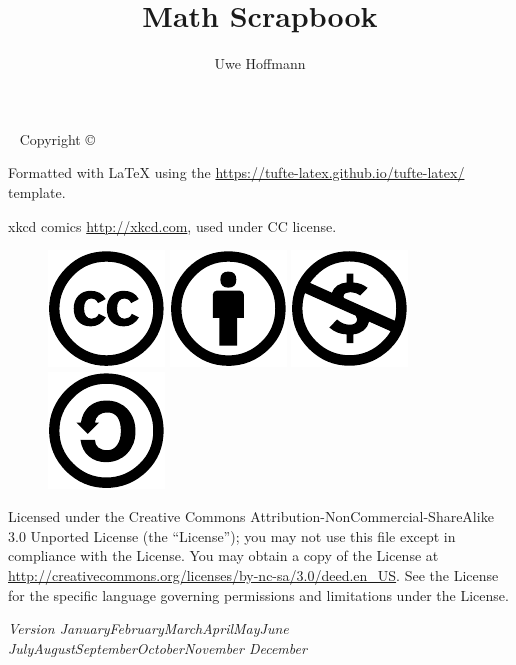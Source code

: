 \documentclass[justified, openany]{tufte-book}
\title{Math Scrapbook}
\author{Uwe Hoffmann}
\newcommand{\monthyear}{%
  \ifcase\month\or January\or February\or March\or April\or May\or June\or
  July\or August\or September\or October\or November\or
  December\fi\space\number\year
}
\theoremstyle{plain}%
\theoremstyle{definition}
\theoremstyle{remark}
\begin{document}

\frontmatter
\maketitle

\newpage
\begin{fullwidth}
~\vfill
\thispagestyle{empty}
\setlength{\parindent}{0pt}
\setlength{\parskip}{\baselineskip}
Copyright \copyright\ \the\year\ \thanklessauthor

\par Formatted with \LaTeX \xspace using the \url{https://tufte-latex.github.io/tufte-latex/} template.

\par xkcd comics \url{http://xkcd.com}, used under CC license.

\par{}

\begin{figure}[h]       
    \mbox{\includegraphics{figs/license/cc.pdf}}   
    \hfill
    \mbox{\includegraphics{figs/license/by.pdf}}
    \hfill
    \mbox{\includegraphics{figs/license/nc.pdf}}
    \hfill
    \mbox{\includegraphics{figs/license/sa.pdf}}
\end{figure}

\par Licensed under the Creative Commons Attribution-NonCommercial-ShareAlike 3.0 Unported License (the ``License''); you may not
use this file except in compliance with the License. You may obtain a copy
of the License at \url{http://creativecommons.org/licenses/by-nc-sa/3.0/deed.en_US}. See the
License for the specific language governing permissions and limitations
under the License.

\par\textit{Version \monthyear}
\end{fullwidth}
\end{document}
